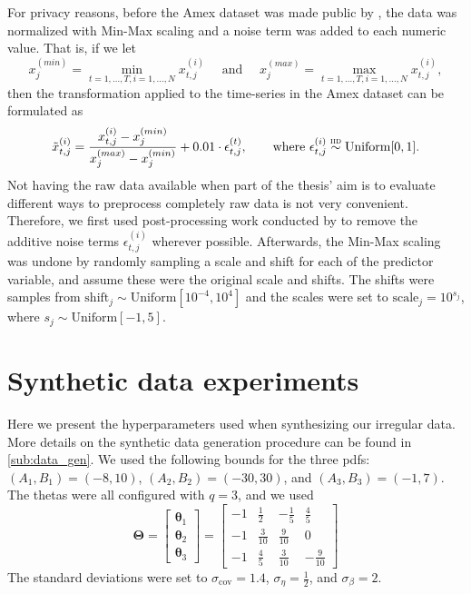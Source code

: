 \documentclass{statsmsc}
\begin{document}
{For privacy reasons, before the Amex dataset was made public by \cite{amex-data}, the data was
normalized with Min-Max scaling and a noise term was added to each numeric value. That is,
if we let 
\begin{equation}
    x_j^{(min)}=\min_{t=1,\dots,T,i=1,\dots,N} x_{t,j}^{(i)}
    \quad \textrm{ and }\quad
    x_j^{(max)}=\max_{t=1,\dots,T,i=1,\dots,N} x_{t,j}^{(i)},
\end{equation}
then the transformation applied to the time-series in the Amex dataset can be formulated as
\begin{equation}
    \tilde{x}_{t,j}^{(i)} = \frac{x_{t,j}^{(i)}-x_j^{(min)}}{x_j^{(max)}-x_j^{(min)}}+0.01\cdot\epsilon_{t,j}^{(t)},
    \qquad \textrm{where }\epsilon_{t,j}^{(i)} \stackrel{\textsc{iid}}{\sim} \textrm{Uniform}[0,1].
\end{equation}
Not having the raw data available when part of the thesis' aim is to evaluate different ways to
preprocess completely raw data is not very convenient. Therefore, we first used post-processing
work conducted by \cite{raddar} to remove the additive noise terms $\epsilon_{t,j}^{(i)}$ wherever
possible. Afterwards, the Min-Max scaling was undone by randomly sampling a scale and shift
for each of the predictor variable, and assume these were the original scale and shifts.
The shifts were samples from $\textrm{shift}_j\sim\textrm{Uniform}[10^{-4}, 10^{4}]$ and the
scales were set to $\textrm{scale}_j=10^{s_j}$, where $s_j\sim\textrm{Uniform}[-1, 5]$.


\chapter{Synthetic data experiments}%
\label{ch:synth_data_appendix}

Here we present the hyperparameters used when synthesizing our irregular data. More details
on the synthetic data generation procedure can be found in \cref{sub:data_gen}.
We used the following bounds for the three \acp{pdf}:
$(A_1,B_1)=(-8, 10)$, $(A_2,B_2)=(-30, 30)$, and $(A_3, B_3)=(-1, 7)$.
The thetas were all configured with $q=3$, and we used
\begin{equation}
    \bm\Theta=\begin{bmatrix}
        \bm\theta_1 \\
        \bm\theta_2 \\
        \bm\theta_3
    \end{bmatrix}
    =
    \begin{bmatrix}
        -1 & \frac{1}{2} & -\frac{1}{5} & \frac{4}{5} \\
        -1 & \frac{3}{10} & \frac{9}{10} & 0 \\
        -1 & \frac{4}{5} & \frac{3}{10} & -\frac{9}{10} 
    \end{bmatrix}
\end{equation}
The standard deviations were set to
$\sigma_{\textrm{cov}}=1.4$, $\sigma_{\eta}=\frac{1}{2}$, and $\sigma_\beta=2$.

}
\end{document}
